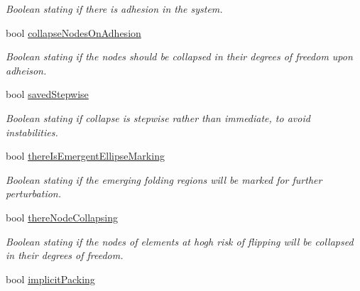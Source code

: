 \begin{DoxyCompactItemize}
\begin{DoxyCompactList}\small\item\em Boolean stating if there is adhesion in the system. \end{DoxyCompactList}\item 
\hypertarget{classSimulation_a6ee4b25647be698c89219c1cca3ba15e}{}bool \hyperlink{classSimulation_a6ee4b25647be698c89219c1cca3ba15e}{collapse\+Nodes\+On\+Adhesion}\label{classSimulation_a6ee4b25647be698c89219c1cca3ba15e}

\begin{DoxyCompactList}\small\item\em Boolean stating if the nodes should be collapsed in their degrees of freedom upon adheison. \end{DoxyCompactList}\item 
\hypertarget{classSimulation_a3b06f6a7a5f9bab315843460f3df7a11}{}bool \hyperlink{classSimulation_a3b06f6a7a5f9bab315843460f3df7a11}{saved\+Stepwise}\label{classSimulation_a3b06f6a7a5f9bab315843460f3df7a11}

\begin{DoxyCompactList}\small\item\em Boolean stating if collapse is stepwise rather than immediate, to avoid instabilities. \end{DoxyCompactList}\item 
\hypertarget{classSimulation_a6f134ccf6b32a0c6daefc77b298bd0f3}{}bool \hyperlink{classSimulation_a6f134ccf6b32a0c6daefc77b298bd0f3}{there\+Is\+Emergent\+Ellipse\+Marking}\label{classSimulation_a6f134ccf6b32a0c6daefc77b298bd0f3}

\begin{DoxyCompactList}\small\item\em Boolean stating if the emerging folding regions will be marked for further perturbation. \end{DoxyCompactList}\item 
\hypertarget{classSimulation_ab123970654b2c9352dca1fb046cc2173}{}bool \hyperlink{classSimulation_ab123970654b2c9352dca1fb046cc2173}{there\+Node\+Collapsing}\label{classSimulation_ab123970654b2c9352dca1fb046cc2173}

\begin{DoxyCompactList}\small\item\em Boolean stating if the nodes of elements at hogh risk of flipping will be collapsed in their degrees of freedom. \end{DoxyCompactList}\item 
\hypertarget{classSimulation_ae940044346e35e17acd9f4c419f9ce4a}{}bool \hyperlink{classSimulation_ae940044346e35e17acd9f4c419f9ce4a}{implicit\+Packing}\label{classSimulation_ae940044346e35e17acd9f4c419f9ce4a}


\end{DoxyCompactItemize}
